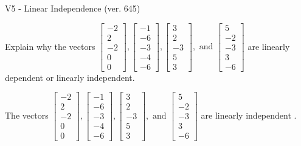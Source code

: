 \begin{exercise}
  \begin{exerciseTitle}V5 - Linear Independence (ver. 645)\end{exerciseTitle}
  \begin{exerciseStatement}
    Explain why the vectors \(\left[\begin{array}{r}
-2 \\
2 \\
-2 \\
0 \\
0
\end{array}\right] , \left[\begin{array}{r}
-1 \\
-6 \\
-3 \\
-4 \\
-6
\end{array}\right] , \left[\begin{array}{r}
3 \\
2 \\
-3 \\
5 \\
3
\end{array}\right] , \text{ and } \left[\begin{array}{r}
5 \\
-2 \\
-3 \\
3 \\
-6
\end{array}\right]\) are linearly dependent or linearly independent.	


  \end{exerciseStatement}
  \begin{exerciseAnswer}
   The vectors \(\left[\begin{array}{r}
-2 \\
2 \\
-2 \\
0 \\
0
\end{array}\right] , \left[\begin{array}{r}
-1 \\
-6 \\
-3 \\
-4 \\
-6
\end{array}\right] , \left[\begin{array}{r}
3 \\
2 \\
-3 \\
5 \\
3
\end{array}\right] , \text{ and } \left[\begin{array}{r}
5 \\
-2 \\
-3 \\
3 \\
-6
\end{array}\right]\) are 
  	 linearly independent  .
  


  \end{exerciseAnswer}
\end{exercise}